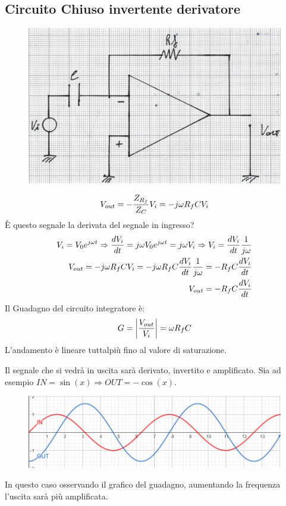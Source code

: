 \documentclass[a4paper, 15pt]{article}
\begin{document}
\subsection{Circuito Chiuso invertente derivatore}
\begin{adjustwidth}{2in}{}    		   		
   		\begin{figure}[H]
   			\centering
   			\includegraphics[width=0.5\linewidth]{immagini/mm(11)}
   			\label{fig:mm11}
   		\end{figure}   		  		
   		\[V_{out} = -{Z_{R_f}\over Z_C}V_i = -j\omega R_fCV_i\]
   		È questo segnale la derivata del segnale in ingresso? 
   		\begin{eqnarray*}
   			V_i = V_0e^{j\omega t}\Rightarrow{dV_i\over dt} = j\omega V_0e^{j\omega t} = j\omega V_i \Rightarrow V_i =  {dV_i\over dt}{{1\over j\omega}}\\
   			V_{out} = -j\omega R_fCV_i = -j\omega R_fC{dV_i\over dt}{{1\over j\omega}} = -R_fC{dV_i\over dt} \\
   			   		V_{out} = -R_fC{dV_i\over dt}
   		\end{eqnarray*}
   		Il Guadagno del circuito integratore è: 
   		\[G = \left|{V_{out}\over V_{i}}\right| = \omega R_fC\]  		
   		L'andamento è lineare tuttalpiù fino al valore di saturazione.   		
   		\begin{figure}[H]
   			\centering
   		\end{figure}  
\newpage  		
   		Il segnale che si vedrà in uscita sarà derivato, invertito e amplificato. Sia ad esempio $IN = \sin(x) \Rightarrow OUT = -\cos(x)$.
   		\begin{figure}[H]
   			\centering
   			\includegraphics[width=0.7\linewidth]{immagini/integratore4}	
   			\label{fig:integratore4}
   		\end{figure}
   		In questo caso osservando il grafico del guadagno, aumentando la frequenza l'uscita sarà più amplificata. 
   		

\end{adjustwidth}
\end{document}
